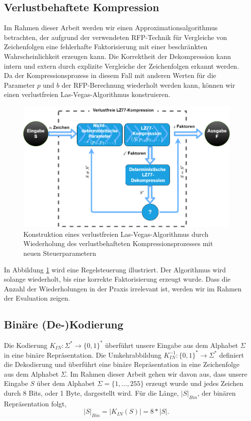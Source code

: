 \subsection{Verlustbehaftete Kompression}
Im Rahmen dieser Arbeit werden wir einen Approximationsalgorithmus betrachten, der aufgrund der verwendeten RFP-Technik für Vergleiche von Zeichenfolgen eine fehlerhafte Faktorisierung mit 
einer beschränkten Wahrscheinlichkeit erzeugen kann. Die Korrektheit der Dekompression kann intern und extern durch explizite Vergleiche der Zeichenfolgen erkannt werden. Da der
Kompressionsprozess in diesem Fall mit anderen Werten für die Parameter $p$ und $b$ der RFP-Berechnung wiederholt werden kann, können wir einen verlustfreien Las-Vegas-Algorithmus konstruieren.

\begin{figure} [ht]
    \centering
    \caption{Konstruktion eines verlustfreien Las-Vegas-Algorithmus durch Wiederholung des verlustbehafteten Kompressionsprozesses mit neuen Steuerparametern}
    \label{fig:lasvegas}
    \includegraphics[scale=0.4]{Images/lasvegas_algorithm.png}
\end{figure}

In Abbildung \ref{fig:lasvegas} wird eine Regelsteuerung illustriert. Der Algorithmus wird solange wiederholt, bis eine korrekte Faktorisierung erzeugt wurde. Dass die
Anzahl der Wiederholungen in der Praxis irrelevant ist, werden wir im Rahmen der Evaluation zeigen.

\subsection{Binäre (De-)Kodierung}
Die Kodierung $K_{IN}: \Sigma^* \rightarrow \{0,1\}^*$ überführt unsere Eingabe aus dem Alphabet $\Sigma$ in eine binäre Repräsentation.
Die Umkehrabbildung $K^{-1}_{IN}: \{0,1\}^* \rightarrow \Sigma^*$ definiert die Dekodierung und überführt eine binäre Repräsentation in eine Zeichenfolge
aus dem Alphabet $\Sigma$. Im Rahmen dieser Arbeit gehen wir davon aus, dass unsere Eingabe $S$ über dem Alphabet $\Sigma=\{1,...,255\}$ erzeugt wurde und 
jedes Zeichen durch 8 Bits, oder 1 Byte, dargestellt wird. Für die Länge, $|S|_{Bin}$, der binären Repräsentation folgt,
\begin{equation}
    |S|_{Bin} = |K_{IN}(S)| = 8*|S|.
\end{equation}

